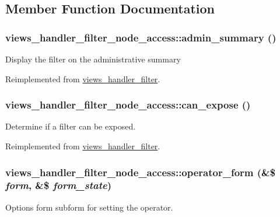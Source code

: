 \subsection{Member Function Documentation}
\hypertarget{classviews__handler__filter__node__access_a2f3abe4aa9418904e52937d1549fd560}{
\subsubsection[{admin\_\-summary}]{\setlength{\rightskip}{0pt plus 5cm}views\_\-handler\_\-filter\_\-node\_\-access::admin\_\-summary ()}}
\label{classviews__handler__filter__node__access_a2f3abe4aa9418904e52937d1549fd560}
Display the filter on the administrative summary 

Reimplemented from \hyperlink{classviews__handler__filter_a655263cd0b73188eec064b9a9743fe4c}{views\_\-handler\_\-filter}.\hypertarget{classviews__handler__filter__node__access_a20eacba1b9be3c0e6b8245191b60a9ff}{
\subsubsection[{can\_\-expose}]{\setlength{\rightskip}{0pt plus 5cm}views\_\-handler\_\-filter\_\-node\_\-access::can\_\-expose ()}}
\label{classviews__handler__filter__node__access_a20eacba1b9be3c0e6b8245191b60a9ff}
Determine if a filter can be exposed. 

Reimplemented from \hyperlink{classviews__handler__filter_af0e5810a2a2f194cd6af0fca9c858756}{views\_\-handler\_\-filter}.\hypertarget{classviews__handler__filter__node__access_af1cb315c0afc295fa7ded78ee47401c8}{
\subsubsection[{operator\_\-form}]{\setlength{\rightskip}{0pt plus 5cm}views\_\-handler\_\-filter\_\-node\_\-access::operator\_\-form (\&\$ {\em form}, \/  \&\$ {\em form\_\-state})}}
\label{classviews__handler__filter__node__access_af1cb315c0afc295fa7ded78ee47401c8}
Options form subform for setting the operator.

